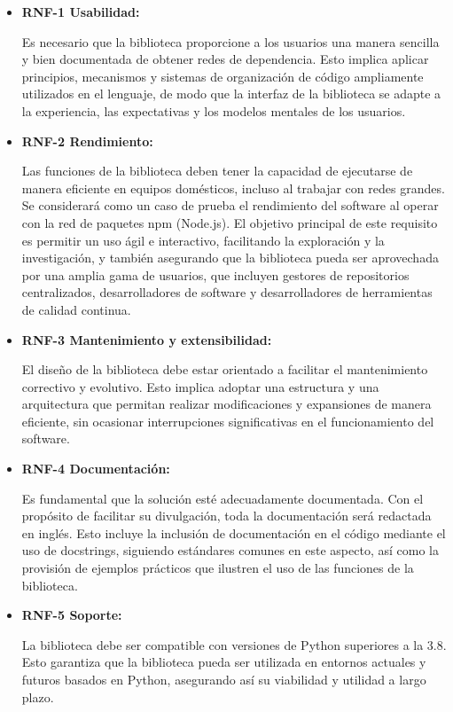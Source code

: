 \begin{itemize}
	\item \textbf{RNF-1 Usabilidad:}
	 
	Es necesario que la biblioteca proporcione a los usuarios una manera sencilla y 
	bien documentada de obtener redes de dependencia. Esto implica aplicar principios, mecanismos y sistemas de organización 
	de código ampliamente utilizados en el lenguaje, de modo que la interfaz de la biblioteca se adapte a la experiencia, 
	las expectativas y los modelos mentales de los usuarios.

	\item \textbf{RNF-2 Rendimiento:} 
	
	Las funciones de la biblioteca deben tener la capacidad de ejecutarse de manera eficiente 
	en equipos domésticos, incluso al trabajar con redes grandes. Se considerará como un caso de prueba el rendimiento del software 
	al operar con la red de paquetes npm (Node.js). El objetivo principal de este requisito es permitir un uso ágil e interactivo, 
	facilitando la exploración y la investigación, y también asegurando que la biblioteca pueda ser aprovechada por una amplia gama 
	de usuarios, que incluyen gestores de repositorios centralizados, desarrolladores de software y desarrolladores de herramientas 
	de calidad continua.

	\item \textbf{RNF-3 Mantenimiento y extensibilidad:} 
	
	El diseño de la biblioteca debe estar orientado a facilitar el mantenimiento 
	correctivo y evolutivo. Esto implica adoptar una estructura y una arquitectura que permitan realizar modificaciones y expansiones 
	de manera eficiente, sin ocasionar interrupciones significativas en el funcionamiento del software.
	
	\item \textbf{RNF-4 Documentación:} 
	
	Es fundamental que la solución esté adecuadamente documentada. Con el propósito de facilitar 
	su divulgación, toda la documentación será redactada en inglés. Esto incluye la inclusión de documentación en el código mediante 
	el uso de docstrings, siguiendo estándares comunes en este aspecto, así como la provisión de ejemplos prácticos que ilustren el 
	uso de las funciones de la biblioteca.
	
	\item \textbf{RNF-5 Soporte:} 
	
	La biblioteca debe ser compatible con versiones de Python superiores a la 3.8. Esto garantiza que 
	la biblioteca pueda ser utilizada en entornos actuales y futuros basados en Python, asegurando así su viabilidad y utilidad a 
	largo plazo.
\end{itemize}


